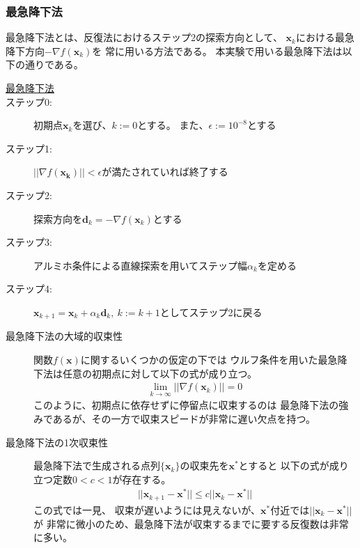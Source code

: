 \documentclass[12pt]{jarticle}
\begin{document}
\subsubsection{最急降下法}
最急降下法とは、反復法におけるステップ2の探索方向として、
$\boldsymbol{x}_k$における最急降下方向$-\nabla f(\boldsymbol{x}_k)$を
常に用いる方法である。
本実験で用いる最急降下法は以下の通りである。
\begin{description}
    \item[\underline{最急降下法}]
    \item[ステップ0:] 初期点$\boldsymbol{x}_k$を選び、$k:=0$とする。
          また、$\epsilon:=10^{-8}$とする
    \item[ステップ1:] $||\nabla f(\boldsymbol{x_k})||<\epsilon$が満たされていれば終了する
    \item[ステップ2:] 探索方向を$\boldsymbol{d}_k=-\nabla f(\boldsymbol{x}_k)$とする
    \item[ステップ3:] アルミホ条件による直線探索を用いてステップ幅$\alpha_k$を定める
    \item[ステップ4:] $\boldsymbol{x}_{k+1}=\boldsymbol{x}_k+\alpha_k \boldsymbol{d}_k,\ k:=k+1$としてステップ2に戻る
\end{description}

\begin{description}
    \item[最急降下法の大域的収束性] 関数$f(\boldsymbol{x})$に関するいくつかの仮定の下では
          ウルフ条件を用いた最急降下法は任意の初期点に対して以下の式が成り立つ。
          \begin{eqnarray}
              \lim_{k\rightarrow \infty}||\nabla f(\boldsymbol{x}_k)||=0\nonumber
          \end{eqnarray}
          このように、初期点に依存せずに停留点に収束するのは
          最急降下法の強みであるが、その一方で収束スピードが非常に遅い欠点を持つ。
    \item[最急降下法の1次収束性] 最急降下法で生成される点列$\{\boldsymbol{x}_k\}$の収束先を$\boldsymbol{x}^*$とすると
          以下の式が成り立つ定数$0<c<1$が存在する。
          \begin{eqnarray}
              ||\boldsymbol{x}_{k+1}-\boldsymbol{x}^*||\leq c||\boldsymbol{x}_{k}-\boldsymbol{x}^*||\nonumber
          \end{eqnarray}
          この式では一見、
          収束が遅いようには見えないが、$\boldsymbol{x}^*$付近では$||\boldsymbol{x}_{k}-\boldsymbol{x}^*||$が
          非常に微小のため、最急降下法が収束するまでに要する反復数は非常に多い。
\end{description}
\end{document}
